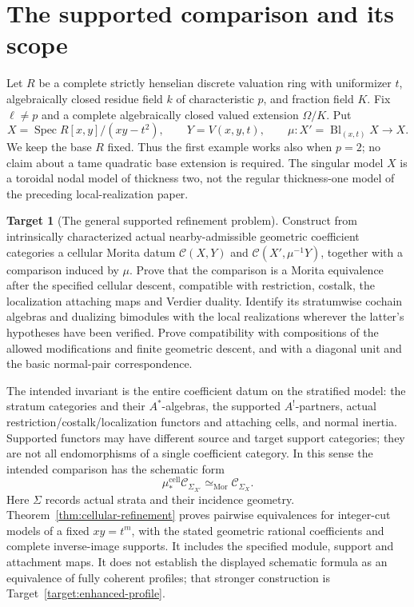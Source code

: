 \documentclass[11pt]{article}
\theoremstyle{definition}
\newtheorem{target}[theorem]{Target}
\theoremstyle{remark}
\newcommand{\Spec}{\operatorname{Spec}}
\begin{document}
\section{The supported comparison and its scope}
Let $R$ be a complete strictly henselian discrete valuation ring with
uniformizer $t$, algebraically closed residue field $k$ of characteristic
$p$, and fraction field $K$.  Fix $\ell\ne p$ and a complete algebraically
closed valued extension $\Omega/K$.  Put
\[
 X=\Spec R[x,y]/(xy-t^2),\qquad Y=V(x,y,t),
 \qquad \mu:X'=\operatorname{Bl}_{(x,t)}X\longrightarrow X.
\]
We keep the base $R$ fixed.  Thus the first example works also when $p=2$;
no claim about a tame quadratic base extension is required.  The singular
model $X$ is a toroidal nodal model of thickness two, not the regular
thickness-one model of the preceding local-realization paper.

\begin{target}[The general supported refinement problem]\label{target:refinement}
Construct from intrinsically characterized actual nearby-admissible
geometric coefficient categories a cellular Morita datum $\mathcal C(X,Y)$ and $\mathcal C(X',\mu^{-1}Y)$, together with a
comparison induced by $\mu$.  Prove that the comparison is a Morita
equivalence after the specified cellular descent, compatible with
restriction, costalk, the localization attaching maps and Verdier duality.
Identify its stratumwise cochain algebras and dualizing bimodules with the
local realizations wherever the latter's hypotheses have been verified.
Prove compatibility with compositions of the allowed modifications and
finite geometric descent, and with a diagonal unit and the basic
normal-pair correspondence.
\end{target}
The intended invariant is the entire coefficient datum on the stratified
model: the stratum categories and their $A^*$-algebras, the supported
$A^!$-partners, actual restriction/costalk/localization functors and
attaching cells, and normal inertia.  Supported functors may have
different source and target support categories; they are not all
endomorphisms of a single coefficient category.  In this sense the
intended comparison has the schematic form
\[
 \mu_*^{\mathrm{cell}}\mathcal C_{\Sigma_{X'}}
       \simeq_{\mathrm{Mor}}\mathcal C_{\Sigma_X}.
\]
Here $\Sigma$ records actual strata and their incidence geometry.
Theorem~\ref{thm:cellular-refinement} proves pairwise equivalences for
integer-cut models of a fixed $xy=t^m$, with the stated geometric
rational coefficients and complete inverse-image supports.  It includes
the specified module, support and attachment maps.  It does not establish
the displayed schematic formula as an equivalence of fully coherent
profiles; that stronger construction is Target~\ref{target:enhanced-profile}.
\end{document}
